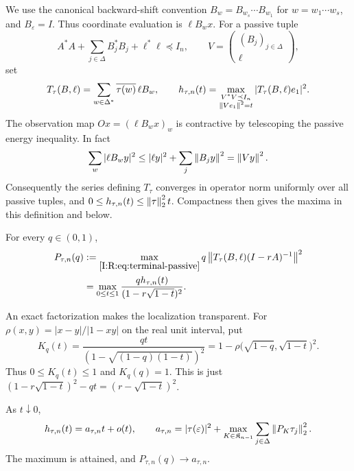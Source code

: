 We use the canonical backward-shift convention
$B_w=B_{w_s}\cdots B_{w_1}$ for $w=w_1\cdots w_s$, and
$B_\varepsilon=I$.  Thus coordinate evaluation is $\ell B_wx$.
For a passive tuple
\begin{equation}
 A^*A+\sum_{j\in\Delta}B_j^*B_j+\ell^*\ell\preceq I_n,
 \qquad V=\begin{pmatrix}(B_j)_{j\in\Delta}\\\ell\end{pmatrix},
 \label{I:R:eq:terminal-passive}
\end{equation}
set
\[
 T_\tau(B,\ell)=\sum_{w\in\Delta^*}
          \overline{\tau(w)}\,\ell B_w,
 \qquad
 h_{\tau,n}(t)=
 \max_{\substack{V^*V\preceq I_n\\\left\lVert Ve_1\right\rVert^2=t}}
                  |T_\tau(B,\ell)e_1|^2.
\]
The observation map $Ox=(\ell B_wx)_w$ is contractive by telescoping
the passive energy inequality.  In fact
\begin{equation}
 \sum_w|\ell B_wy|^2
 \le |\ell y|^2+\sum_j\left\lVert B_jy\right\rVert^2=\left\lVert Vy\right\rVert^2.
 \label{I:R:eq:terminal-refined-energy}
\end{equation}
Consequently the series defining $T_\tau$ converges in operator norm
uniformly over all passive tuples, and
$0\le h_{\tau,n}(t)\le\left\lVert\tau\right\rVert_2^2t$.  Compactness then gives the
maxima in this definition and below.

\begin{lemma}
\label{I:R:lem:terminal-elimination}
For every $q\in(0,1)$,
\begin{align}
 P_{\tau,n}(q)
 &:=\max_{\eqref{I:R:eq:terminal-passive}}
       q\left\lVert T_\tau(B,\ell)(I-rA)^{-1}\right\rVert^2\notag\\
 &=\max_{0\le t\le1}
       \frac{q h_{\tau,n}(t)}{(1-r\sqrt{1-t})^2}.
 \label{I:R:eq:terminal-elimination}
\end{align}
\end{lemma}


An exact factorization makes the localization transparent.  For
$\rho(x,y)=|x-y|/|1-xy|$ on the real unit interval, put
\begin{equation}
 K_q(t)=\frac{qt}{(1-\sqrt{(1-q)(1-t)})^2}
       =1-\rho\bigl(\sqrt{1-q},\sqrt{1-t}\bigr)^2.
 \label{I:R:eq:terminal-kernel}
\end{equation}
Thus $0\le K_q(t)\le1$ and $K_q(q)=1$.  This is just
$(1-r\sqrt{1-t})^2-qt=(r-\sqrt{1-t})^2$.

\begin{lemma}
\label{I:R:lem:terminal-dimension-drop}
As $t\downarrow0$,
\begin{equation}
 h_{\tau,n}(t)=a_{\tau,n}t+o(t),
 \qquad
 a_{\tau,n}=|\tau(\varepsilon)|^2+
       \max_{K\in\mathfrak K_{n-1}}
             \sum_{j\in\Delta}\left\lVert P_K\tau_j\right\rVert_2^2.
 \label{I:R:eq:terminal-leading-coefficient}
\end{equation}
The maximum is attained, and $P_{\tau,n}(q)\to a_{\tau,n}$.
\end{lemma}


